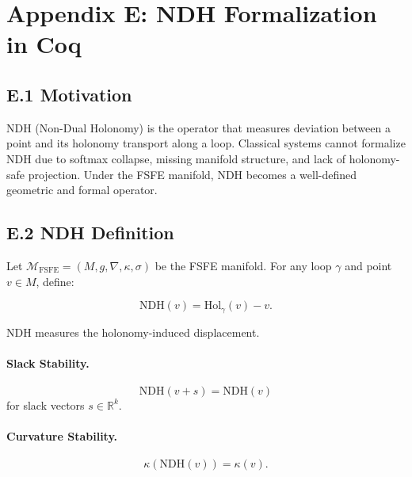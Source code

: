 
\appendix
\section{Appendix E: NDH Formalization in Coq}
\label{appendix:ndhcoq}

\subsection{E.1 Motivation}

NDH (Non-Dual Holonomy) is the operator that measures deviation between a point
and its holonomy transport along a loop. Classical systems cannot formalize NDH
due to softmax collapse, missing manifold structure, and lack of holonomy-safe
projection. Under the FSFE manifold, NDH becomes a well-defined geometric and
formal operator.

\subsection{E.2 NDH Definition}

Let $\mathcal{M}_{\mathrm{FSFE}} = (M, g, \nabla, \kappa, \sigma)$ be the FSFE
manifold. For any loop $\gamma$ and point $v \in M$, define:

\[
\mathrm{NDH}(v) = \mathrm{Hol}_\gamma(v) - v.
\]

NDH measures the holonomy-induced displacement.

\paragraph{Slack Stability.}
\[
\mathrm{NDH}(v + s) = \mathrm{NDH}(v)
\]
for slack vectors $s \in \mathbb{R}^k$.

\paragraph{Curvature Stability.}
\[
\kappa(\mathrm{NDH}(v)) = \kappa(v).
\]

